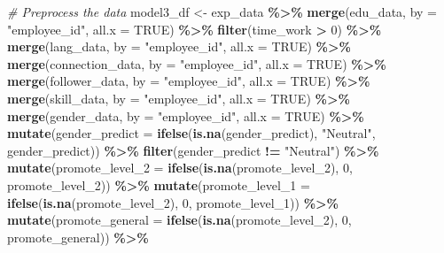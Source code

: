 \documentclass[11pt,]{article}
\newenvironment{Shaded}{\begin{snugshade}}{\end{snugshade}}
\newcommand{\AttributeTok}[1]{\textcolor[rgb]{0.13,0.29,0.53}{#1}}
\newcommand{\CommentTok}[1]{\textcolor[rgb]{0.56,0.35,0.01}{\textit{#1}}}
\newcommand{\ConstantTok}[1]{\textcolor[rgb]{0.56,0.35,0.01}{#1}}
\newcommand{\DecValTok}[1]{\textcolor[rgb]{0.00,0.00,0.81}{#1}}
\newcommand{\FunctionTok}[1]{\textcolor[rgb]{0.13,0.29,0.53}{\textbf{#1}}}
\newcommand{\NormalTok}[1]{#1}
\newcommand{\OtherTok}[1]{\textcolor[rgb]{0.56,0.35,0.01}{#1}}
\newcommand{\SpecialCharTok}[1]{\textcolor[rgb]{0.81,0.36,0.00}{\textbf{#1}}}
\newcommand{\StringTok}[1]{\textcolor[rgb]{0.31,0.60,0.02}{#1}}
\begin{document}
\begin{Shaded}
\begin{Highlighting}[]
\CommentTok{\# Preprocess the data}
\NormalTok{model3\_df }\OtherTok{\textless{}{-}}\NormalTok{ exp\_data }\SpecialCharTok{\%\textgreater{}\%}
  \FunctionTok{merge}\NormalTok{(edu\_data, }\AttributeTok{by =} \StringTok{"employee\_id"}\NormalTok{, }\AttributeTok{all.x =} \ConstantTok{TRUE}\NormalTok{) }\SpecialCharTok{\%\textgreater{}\%}
  \FunctionTok{filter}\NormalTok{(time\_work }\SpecialCharTok{\textgreater{}} \DecValTok{0}\NormalTok{) }\SpecialCharTok{\%\textgreater{}\%} 
  \FunctionTok{merge}\NormalTok{(lang\_data, }\AttributeTok{by =} \StringTok{"employee\_id"}\NormalTok{, }\AttributeTok{all.x =} \ConstantTok{TRUE}\NormalTok{) }\SpecialCharTok{\%\textgreater{}\%}
  \FunctionTok{merge}\NormalTok{(connection\_data, }\AttributeTok{by =} \StringTok{"employee\_id"}\NormalTok{, }\AttributeTok{all.x =} \ConstantTok{TRUE}\NormalTok{) }\SpecialCharTok{\%\textgreater{}\%}
  \FunctionTok{merge}\NormalTok{(follower\_data, }\AttributeTok{by =} \StringTok{"employee\_id"}\NormalTok{, }\AttributeTok{all.x =} \ConstantTok{TRUE}\NormalTok{) }\SpecialCharTok{\%\textgreater{}\%}
  \FunctionTok{merge}\NormalTok{(skill\_data, }\AttributeTok{by =} \StringTok{"employee\_id"}\NormalTok{, }\AttributeTok{all.x =} \ConstantTok{TRUE}\NormalTok{) }\SpecialCharTok{\%\textgreater{}\%} 
  \FunctionTok{merge}\NormalTok{(gender\_data, }\AttributeTok{by =} \StringTok{"employee\_id"}\NormalTok{, }\AttributeTok{all.x =} \ConstantTok{TRUE}\NormalTok{) }\SpecialCharTok{\%\textgreater{}\%} 
  \FunctionTok{mutate}\NormalTok{(}\AttributeTok{gender\_predict =} \FunctionTok{ifelse}\NormalTok{(}\FunctionTok{is.na}\NormalTok{(gender\_predict), }\StringTok{"Neutral"}\NormalTok{, gender\_predict)) }\SpecialCharTok{\%\textgreater{}\%}
  \FunctionTok{filter}\NormalTok{(gender\_predict }\SpecialCharTok{!=} \StringTok{"Neutral"}\NormalTok{) }\SpecialCharTok{\%\textgreater{}\%} 
  \FunctionTok{mutate}\NormalTok{(}\AttributeTok{promote\_level\_2 =} \FunctionTok{ifelse}\NormalTok{(}\FunctionTok{is.na}\NormalTok{(promote\_level\_2), }\DecValTok{0}\NormalTok{, promote\_level\_2)) }\SpecialCharTok{\%\textgreater{}\%}
  \FunctionTok{mutate}\NormalTok{(}\AttributeTok{promote\_level\_1 =} \FunctionTok{ifelse}\NormalTok{(}\FunctionTok{is.na}\NormalTok{(promote\_level\_2), }\DecValTok{0}\NormalTok{, promote\_level\_1)) }\SpecialCharTok{\%\textgreater{}\%}
  \FunctionTok{mutate}\NormalTok{(}\AttributeTok{promote\_general =} \FunctionTok{ifelse}\NormalTok{(}\FunctionTok{is.na}\NormalTok{(promote\_level\_2), }\DecValTok{0}\NormalTok{, promote\_general)) }\SpecialCharTok{\%\textgreater{}\%}

\end{Highlighting}
\end{Shaded}
\end{document}
